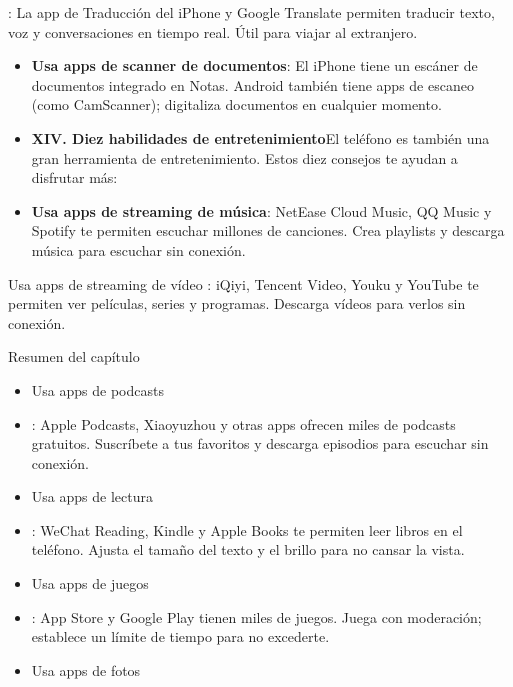 
: La app de Traducción del iPhone y Google Translate permiten traducir texto, voz y conversaciones en tiempo real. Útil para viajar al extranjero.

\begin{itemize}
  \item \textbf{Usa apps de scanner de documentos}: El iPhone tiene un escáner de documentos integrado en Notas. Android también tiene apps de escaneo (como CamScanner); digitaliza documentos en cualquier momento.
  \item \textbf{XIV. Diez habilidades de entretenimiento}El teléfono es también una gran herramienta de entretenimiento. Estos diez consejos te ayudan a disfrutar más:
  \item \textbf{Usa apps de streaming de música}: NetEase Cloud Music, QQ Music y Spotify te permiten escuchar millones de canciones. Crea playlists y descarga música para escuchar sin conexión.
\end{itemize}

\begin{tcbwarn}{Usa apps de streaming de vídeo}
: iQiyi, Tencent Video, Youku y YouTube te permiten ver películas, series y programas. Descarga vídeos para verlos sin conexión.

\end{tcbwarn}

\begin{tcbsummary}{Resumen del capítulo}
\begin{itemize}
  \item Usa apps de podcasts
  \item : Apple Podcasts, Xiaoyuzhou y otras apps ofrecen miles de podcasts gratuitos. Suscríbete a tus favoritos y descarga episodios para escuchar sin conexión.
  \item Usa apps de lectura
  \item : WeChat Reading, Kindle y Apple Books te permiten leer libros en el teléfono. Ajusta el tamaño del texto y el brillo para no cansar la vista.
  \item Usa apps de juegos
  \item : App Store y Google Play tienen miles de juegos. Juega con moderación; establece un límite de tiempo para no excederte.
  \item Usa apps de fotos
\end{itemize}

\end{tcbsummary}

